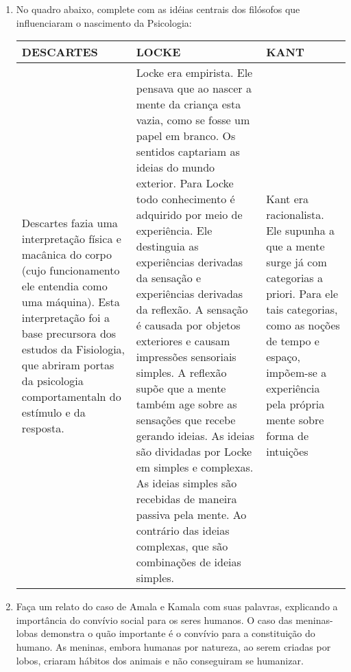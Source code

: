 \documentclass[a4paper, 12pt]{article}
\begin{document}
\begin{enumerate}
\item No quadro abaixo, complete com as idéias centrais dos filósofos que influenciaram o nascimento da Psicologia: \newline \newline
  \centering
  \begin{tabular}{| m{4cm} | m{4cm} | m{4cm} |}
    \hline
    \textbf{DESCARTES} & \textbf{LOCKE} & \textbf{KANT} \\ \hline
    Descartes fazia uma interpretação física e macânica do corpo (cujo funcionamento ele entendia como uma máquina). Esta interpretação foi a base precursora dos estudos da Fisiologia, que abriram portas  da psicologia comportamentaln do estímulo e da resposta. & Locke era empirista. Ele pensava que ao nascer a mente da criança esta vazia, como se fosse um papel em branco. Os sentidos captariam as ideias do mundo exterior. Para Locke todo conhecimento é adquirido por meio de experiência. Ele destinguia as experiências derivadas da sensação e experiências derivadas da reflexão. A sensação é causada por objetos exteriores e causam impressões sensoriais simples. A reflexão supõe que a mente também age sobre as sensações que recebe gerando ideias. As ideias são dividadas por Locke em simples e complexas. As ideias simples são recebidas de maneira passiva pela mente. Ao contrário das ideias complexas, que são combinações de ideias simples. & Kant era racionalista. Ele supunha a que a mente surge já com categorias a priori. Para ele tais categorias, como as noções de tempo e espaço, impõem-se a experiência pela própria mente sobre forma de intuições \\ \hline
  \end{tabular} \newline
  
\item Faça um relato do caso de Amala e Kamala com suas palavras, explicando a importância do convívio social para os seres humanos. \newline \newline
  O caso das meninas-lobas demonstra o quão importante é o convívio para a constituição do humano. As meninas, embora humanas por natureza, ao serem criadas por lobos, criaram hábitos dos animais e não conseguiram se humanizar.
\end{enumerate}
\end{document}
